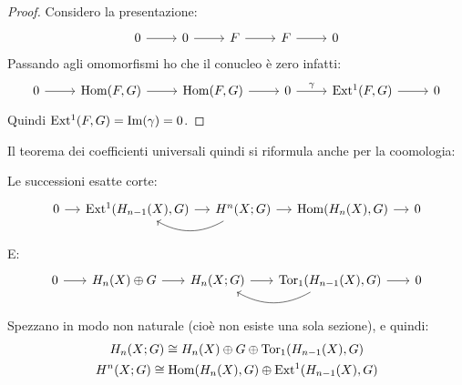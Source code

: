 \begin{proof}
  Considero la presentazione:
  \[
    \begin{tikzcd}
      0 \rar & 0 \rar & F \rar & F \rar & 0
    \end{tikzcd}
  \]
  Passando agli omomorfismi ho che il conucleo è zero infatti:
  \[
    \begin{tikzcd}
      0 \rar & \hom{F,G} \rar & \hom{F,G} \rar & 0 \rar{\gamma} & \ext{F,G} \rar & 0
    \end{tikzcd}
  \]
  Quindi $ \mathrm{Ext^1}( F,G) = \mathrm{Im}( \gamma ) = 0 $.
\end{proof}
\eproof
Il teorema dei coefficienti universali quindi si riformula anche per la coomologia:
\begin{theorem}
  Le successioni esatte corte:
  \[
    \begin{tikzcd}[nodes = {column sep = 12 pt}]
      0 \rar & \ext{H_{n-1}(X), G} \rar & H^n(X;G) \arrow[bend left]{l}{} \rar & \hom{H_n(X), G} \rar & 0
    \end{tikzcd}
  \]
  E:
  \[
    \begin{tikzcd}[nodes = {column sep = 18 pt}]
      0 \rar & H_n(X) \oplus G \rar & H_n(X; G) \rar & \arrow[bend left]{l}{} \tor{H_{n-1}(X), G} \rar & 0
    \end{tikzcd}
  \]
  Spezzano in modo non naturale (cioè non esiste una sola sezione), e quindi:
  \begin{gather*}
    H_n(X; G) \cong H_n(X) \oplus G \oplus \mathrm{Tor_1}( H_{n-1}(X), G) \\
    H^n(X; G) \cong \mathrm{Hom}( H_n(X), G) \oplus \mathrm{Ext^1}( H_{n-1}(X), G)
  \end{gather*}
\end{theorem}
%
%
